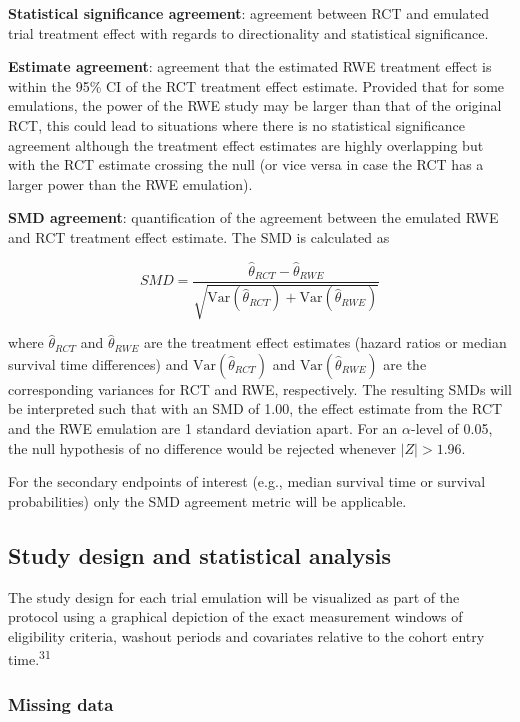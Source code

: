 \documentclass[
  letterpaper,
  DIV=11,
  numbers=noendperiod]{scrartcl}
\begin{document}
\textbf{Statistical significance agreement}: agreement between RCT and
emulated trial treatment effect with regards to directionality and
statistical significance.

\textbf{Estimate agreement}: agreement that the estimated RWE treatment
effect is within the 95\% CI of the RCT treatment effect estimate.
Provided that for some emulations, the power of the RWE study may be
larger than that of the original RCT, this could lead to situations
where there is no statistical significance agreement although the
treatment effect estimates are highly overlapping but with the RCT
estimate crossing the null (or vice versa in case the RCT has a larger
power than the RWE emulation).

\textbf{SMD agreement}: quantification of the agreement between the
emulated RWE and RCT treatment effect estimate. The SMD is calculated as

\[
SMD = \frac{\hat{\theta}_{RCT} - \hat{\theta}_{RWE}}{\sqrt{\text{Var}(\hat{\theta}_{RCT}) + \text{Var}(\hat{\theta}_{RWE})}}
\]

where \(\hat{\theta}_{RCT}\) and \(\hat{\theta}_{RWE}\) are the
treatment effect estimates (hazard ratios or median survival time
differences) and \(\text{Var}(\hat{\theta}_{RCT})\) and
\(\text{Var}(\hat{\theta}_{RWE})\) are the corresponding variances for
RCT and RWE, respectively. The resulting SMDs will be interpreted such
that with an SMD of 1.00, the effect estimate from the RCT and the RWE
emulation are 1 standard deviation apart. For an \(\alpha\)-level of
0.05, the null hypothesis of no difference would be rejected whenever
\(|Z| > 1.96\).

For the secondary endpoints of interest (e.g., median survival time or
survival probabilities) only the SMD agreement metric will be
applicable.

\subsection{Study design and statistical
analysis}\label{study-design-and-statistical-analysis}

The study design for each trial emulation will be visualized as part of
the protocol using a graphical depiction of the exact measurement
windows of eligibility criteria, washout periods and covariates relative
to the cohort entry time.\textsuperscript{31}

\subsubsection{Missing data}\label{missing-data}
\end{document}
